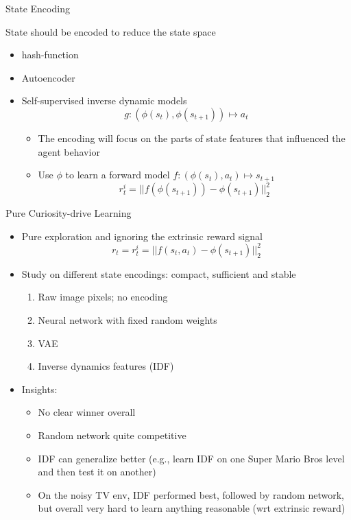 \begin{frame}[c]{State Encoding}
	

	State should be encoded to reduce the state space
	\begin{itemize}
		\item hash-function~
		\item Autoencoder~
		\item Self-supervised inverse dynamic models~
		$$g: (\phi(s_t), \phi(s_{t+1})) \mapsto a_t $$
		\begin{itemize}
			\item The encoding will focus on the parts of state features that influenced the agent behavior
			\item Use $\phi$ to learn a forward model $f: (\phi(s_t), a_t) \mapsto s_{t+1}$
			$$ r_t^i = || f(\phi(s_{t+1})) - \phi(s_{t+1})||^2_2$$
		\end{itemize}
	\end{itemize}
	
	
\end{frame}
\begin{frame}[c]{Pure Curiosity-drive Learning~}
	
	
	\begin{itemize}
		\item Pure exploration and ignoring the extrinsic reward signal
		$$r_t  = r_t^i = ||f(s_t, a_t) - \phi(s_{t+1}) ||_2^2 $$
		\item Study on different state encodings: compact, sufficient and stable
		\begin{enumerate}
			\item Raw image pixels; no encoding
			\item Neural network with fixed random weights
			\item VAE
			\item Inverse dynamics features (IDF)
		\end{enumerate}
		\item Insights:
		\begin{itemize}
			\item No clear winner overall
			\item Random network quite competitive
			\item IDF can generalize better (e.g., learn IDF on one Super Mario Bros level and then test it on another)
			\item On the noisy TV env, IDF performed best, followed by random network, but overall very hard to learn anything reasonable (wrt extrinsic reward)
		\end{itemize}
	\end{itemize}
	
	
\end{frame}
